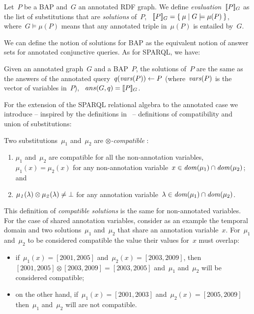 \begin{definition}
  \label{def:btpmatch}
  Let~$P$ be a \ac{BAP} and~$G$ an annotated \ac{RDF} graph. We define \emph{evaluation}~$[\![ P ]\!]_G$ as the list
  of substitutions that are \emph{solutions} of~$P$, \ie~$[\![ P ]\!]_G = \left\{\: \mu \mid G \models \mu(P) \:\right\}$, where~$G
  \models \mu(P)$ means that any annotated triple in~$\mu(P)$ is entailed by~$G$.
\end{definition}
%
\nd We can define the notion of solutions for \ac{BAP} as the equivalent notion of answer sets for annotated conjunctive
queries. As for SPARQL, we have:
%
\begin{proposition}
  \label{ppp}
  Given an annotated graph~$G$ and a \ac{BAP}~$P$, the solutions of~$P$ are the same as the answers of the annotated
  query~$\mathit{q}\!\left(\mathit{vars}\!\left(P\right)\right) \leftarrow P$ (where~$\mathit{vars}\!\left(P\right)$ is the vector of variables in~$P$), \ie~$ans(G,q) =
  [\![ P ]\!]_{G}$.
\end{proposition}

\nd For the extension of the SPARQL relational algebra to the annotated case we introduce -- inspired by the definitions
in~\cite{PerezArenasGutierrez:2009aa} -- definitions of compatibility and union of substitutions:

\begin{definition}
  Two substitutions~$\mu_1$ and~$\mu_2$ are \emph{$\otimes$-compatible} \iff:
  \begin{enumerate}[label=(\roman*),noitemsep]
  \item $\mu_1$ and~$\mu_2$ are compatible for all the non-annotation variables, \ie~$\mu_1(x) = \mu_2(x)$ for any
    non-annotation variable~$x\in \mathit{dom}\!\left(\mu_1\right) \cap \mathit{dom}\!\left(\mu_2\right)$; and
  \item $\mathit{\mu_1}\!\left(\lambda\right) \otimes \mathit{\mu_2}\!\left(\lambda\right) \neq \bot$ for any annotation variable~$\lambda \in
    \mathit{dom}\!\left(\mu_1\right) \cap \mathit{dom}\!\left(\mu_2\right)$.
  \end{enumerate}
\end{definition}
%
\nd This definition of \emph{compatible solutions} is the same for non-annotated variables.
%
For the case of shared annotation variables, consider as an example the temporal domain and two solutions~$\mu_1$
and~$\mu_2$ that share an annotation variable~$x$.  
%
For~$\mu_1$ and~$\mu_2$ to be considered compatible the value their values for~$x$ must overlap:
%
\begin{itemize}[noitemsep]
\item if~$\mu_1(x) = [2001, 2005]$ and~$\mu_2(x) = [2003, 2009]$, then~$[2001, 2005] \otimes [2003, 2009] = [2003,
  2005]$ and~$\mu_1$ and~$\mu_2$ will be considered compatible;
\item on the other hand, if~$\mu_1(x) = [2001, 2003]$ and~$\mu_2(x) = [2005, 2009]$ then~$\mu_1$ and~$\mu_2$
  will are not compatible.
\end{itemize}



